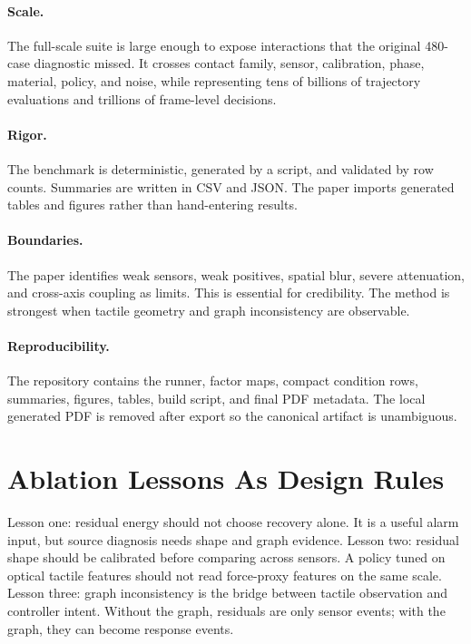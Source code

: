\documentclass{article}
\begin{document}
\paragraph{Scale.}
The full-scale suite is large enough to expose interactions that the original 480-case diagnostic missed. It crosses contact family, sensor, calibration, phase, material, policy, and noise, while representing tens of billions of trajectory evaluations and trillions of frame-level decisions.

\paragraph{Rigor.}
The benchmark is deterministic, generated by a script, and validated by row counts. Summaries are written in CSV and JSON. The paper imports generated tables and figures rather than hand-entering results.

\paragraph{Boundaries.}
The paper identifies weak sensors, weak positives, spatial blur, severe attenuation, and cross-axis coupling as limits. This is essential for credibility. The method is strongest when tactile geometry and graph inconsistency are observable.

\paragraph{Reproducibility.}
The repository contains the runner, factor maps, compact condition rows, summaries, figures, tables, build script, and final PDF metadata. The local generated PDF is removed after export so the canonical artifact is unambiguous.

\section{Ablation Lessons As Design Rules}

Lesson one: residual energy should not choose recovery alone. It is a useful alarm input, but source diagnosis needs shape and graph evidence. Lesson two: residual shape should be calibrated before comparing across sensors. A policy tuned on optical tactile features should not read force-proxy features on the same scale. Lesson three: graph inconsistency is the bridge between tactile observation and controller intent. Without the graph, residuals are only sensor events; with the graph, they can become response events.
\end{document}

